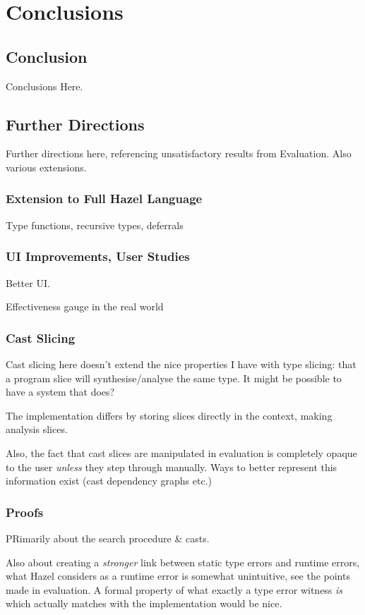 \chapter{Conclusions}\label{chap:Conclusions}

\section{Conclusion}
Conclusions Here.

\section{Further Directions}
Further directions here, referencing unsatisfactory results from Evaluation. Also various extensions.
\subsection{Extension to Full Hazel Language}
Type functions, recursive types, deferrals

\subsection{UI Improvements, User Studies}
Better UI.

Effectiveness gauge in the real world

\subsection{Cast Slicing}
Cast slicing here doesn't extend the nice properties I have with type slicing: that a program slice will synthesise/analyse the same type. It might be possible to have a system that does?

The implementation differs by storing slices directly in the context, making analysis slices.

Also, the fact that cast slices are manipulated in evaluation is completely opaque to the user \textit{unless} they step through manually. Ways to better represent this information exist (cast dependency graphs etc.)

\subsection{Proofs}
PRimarily about the search procedure \& casts. 

Also about creating a \textit{stronger} link between static type errors and runtime errors, what Hazel considers as a runtime error is somewhat unintuitive, see the points made in evaluation. A formal property of what exactly a type error witness \textit{is} which actually matches with the implementation would be nice.


